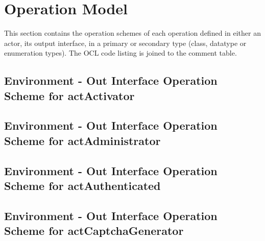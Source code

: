 \chapter{Operation Model}
\label{chap:lu.uni.lassy.excalibur.examples.icrash-OM}

This section contains the operation schemes of each operation defined in either an actor, its output interface, in a primary or secondary type (class, datatype or enumeration types). 
The \msrmessir OCL code listing is joined to the comment table.

\lstset{
float,
basicstyle=\scriptsize,
language=Messir,
breakatwhitespace=false,
tabsize=2,
breaklines=true,
numbers=left,
emptylines=1,
numbersep=5pt,
showspaces=false,
showstringspaces=false,
showtabs=false
} 



		
\section{Environment - Out Interface Operation Scheme for actActivator}
\label{OM-EM-OutInterface-OS-actActivator}


\section{Environment - Out Interface Operation Scheme for actAdministrator}
\label{OM-EM-OutInterface-OS-actAdministrator}


\section{Environment - Out Interface Operation Scheme for actAuthenticated}
\label{OM-EM-OutInterface-OS-actAuthenticated}



\section{Environment - Out Interface Operation Scheme for actCaptchaGenerator}
\label{OM-EM-OutInterface-OS-actCaptchaGenerator}


